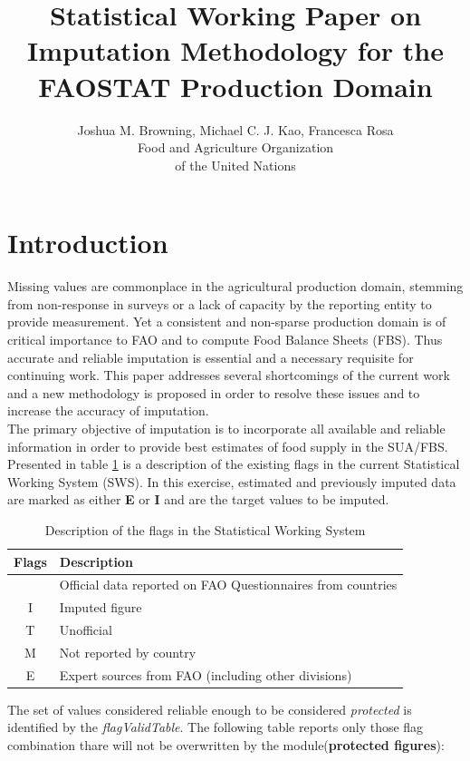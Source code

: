 \documentclass[nojss]{jss}
\title{Statistical Working Paper on Imputation Methodology for
  the FAOSTAT Production Domain }
\author{Joshua M. Browning, Michael C. J. Kao, Francesca Rosa\\ Food and Agriculture Organization \\ of the United Nations}
\begin{document}

\SwaveParseOpstions

\section{Introduction}
Missing values are commonplace in the agricultural production domain,
stemming from non-response in surveys or a lack of capacity by the
reporting entity to provide measurement. Yet a consistent and
non-sparse production domain is of critical importance to FAO and to compute Food Balance
Sheets (FBS). Thus accurate and reliable imputation is essential and a
necessary requisite for continuing work. This paper addresses several
shortcomings of the current work and a new methodology is proposed in
order to resolve these issues and to increase the accuracy of
imputation.\\

The primary objective of imputation is to incorporate all
available and reliable information in order to provide best estimates of
food supply in the SUA/FBS.\\

Presented in table \ref{tab:swsflag} is a description of the existing
flags in the current Statistical Working System (SWS). In this
exercise, estimated and previously imputed data are marked as
either \textbf{E} or \textbf{I} and are the target values to
be imputed.\\

\begin{table}[h!]
  \label{tab:swsflag}
  \caption{Description of the flags in the Statistical Working System}
  \begin{center}
    \begin{tabular}{|c||p{12cm}|}
      \hline
      Flags & Description\\
      \hline
      & Official data reported on FAO Questionnaires from countries\\
      I & Imputed figure\\
      T & Unofficial\\
      M & Not reported by country\\
      E & Expert sources from FAO (including other divisions)\\
      \hline
    \end{tabular}
  \end{center}
\end{table}


The set of values considered reliable enough to be considered \textit{protected} is identified by the \textit{flagValidTable}. The following table reports only those flag combination thare will not be overwritten by the module(\textbf{protected figures}):
\end{document}
